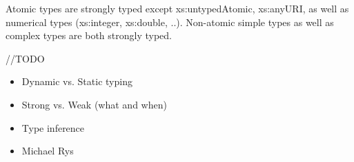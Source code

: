 Atomic types are strongly typed except xs:untypedAtomic, xs:anyURI, as well as
numerical types (xs:integer, xs:double, ..). Non-atomic simple types as well as
complex types are both strongly typed.

//TODO
\begin{itemize}
  \item Dynamic vs. Static typing
  \item Strong vs. Weak (what and when)
  \item Type inference
  \item Michael Rys
\end{itemize}
